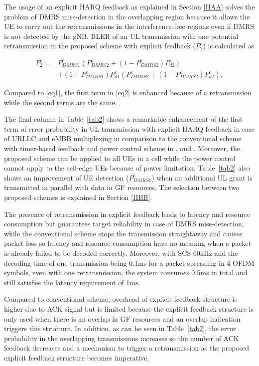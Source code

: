 \documentclass[conference]{IEEEtran}
\begin{document}
The usage of an explicit HARQ feedback as explained in Section \ref{IIAA} solves the problem of DMRS miss-detection in the overlapping region because it allows the UE to carry out the retransmissions in the interference-free regions even if DMRS is not detected by the gNB. BLER of an UL transmission with one potential retransmission in the proposed scheme with explicit feedback ($ P^{e}_{2}$) is calculated as\useshortskip

\begin{equation}
\begin{split}
 P^{e}_{2} =& P^{e}_{DMRS1}(P^{e}_{DMRS2} + (1-P^{e}_{DMRS2})P^{e}_{d2}) \\
        &+ (1-P^{e}_{DMRS1})P^{e}_{d1}(P^{e}_{DMRS2} + (1-P^{e}_{DMRS2})P^{e}_{d2}),\label{eq2}   
\end{split}
\end{equation}

Compared to \eqref{eq1}, the first term in \eqref{eq2} is enhanced because of a retransmssion while the second terms are the same.

The final column in Table~\ref{tab2} shows a remarkable enhancement of the first term of error probability in UL transmission with explicit HARQ feedback in case of URLLC and eMBB multiplexing in comparison to the conventional scheme with timer-based feedback and power control scheme in \cite{b1}, \cite{b2} and \cite{b3}. Moreover, the proposed scheme can be applied to all UEs in a cell while the power control cannot apply to the cell-edge UEs because of power limitation. Table~\ref{tab2} also shows an improvement of UE detection ($P^{e}_{DMRS1}$) when an additional UL grant is transmitted in parallel with data in GF resources. The selection between two proposed schemes is explained in Section \ref{IIBB}.
 
The presence of retransmission in explicit feedback leads to latency and resource consumption but guarantees target reliability in case of DMRS miss-detection, while the conventional scheme stops the transmission straightaway and causes packet loss so latency and resource consumption have no meaning when a packet is already failed to be decoded correctly. Moreover, with SCS 60kHz and the decoding time of one transmission being 0.1ms for a packet spreading in 4 OFDM symbols, even with one retransmission, the system consumes 0.5ms in total and still satisfies the latency requirement of 1ms.

 Compared to conventional scheme, overhead of explicit feedback structure is higher due to ACK signal but is limited because the explicit feedback structure is only used when there is an overlap in GF resources and an overlap indication triggers this structure. In addition, as can be seen in Table~\ref{tab2}, the error probability in the overlapping transmissions increases so the number of ACK feedback decreases and a mechanism to trigger a retransmission as the proposed explicit feedback structure becomes imperative.
\end{document}
